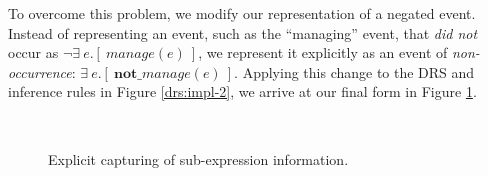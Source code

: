 To overcome this problem, we modify our representation of a negated event. 
Instead of representing an event, such as the ``managing'' event, that
{\it did not} occur as $\lnot \exists~ e.[~ manage(e) ~]$, we represent it
explicitly as an event of {\it non-occurrence}: $\exists~ e.[~
\textbf{not\_}manage(e) ~]$.  Applying this change to the DRS and inference
rules in Figure \ref{drs:impl-2}, we arrive at our final form in Figure
\ref{drs:impl-3}.

\begin{figure}
  \centering
  ~~~~~~~~~
  \caption{Explicit capturing of sub-expression information.}
  \label{drs:impl-3}
\end{figure}

